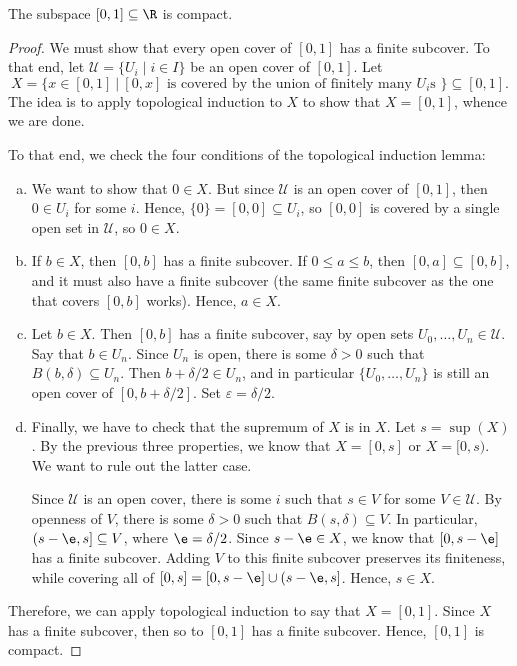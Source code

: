 \documentclass[noname]{notes}
\begin{document}
\begin{theorem}
	The subspace $[0,1] \subseteq \R$ is compact. 
\end{theorem}

\begin{proof}
	We must show that every open cover of $[0,1]$ has a finite subcover. To that end, let $\mathcal U = \{U_i \mid i \in I\}$ be an open cover of $[0,1]$. 
	Let 
	\[
		X = \Big\{ x\in [0,1] \ \Big\vert\ [0,x] \text{ is covered by the union of finitely many $U_i$s } \Big\} \subseteq [0,1].
	\]
	The idea is to apply topological induction to $X$ to show that $X = [0,1]$, whence we are done. 
	
	To that end, we check the four conditions of the topological induction lemma: 
	\begin{enumerate}[(a)]
		\item We want to show that $0 \in X$. But since $\mathcal U$ is an open cover of $[0,1]$, then $0 \in U_i$ for some $i$. Hence, $\{0\} = [0,0] \subseteq U_i$, so $[0,0]$ is covered by a single open set in $\mathcal U$, so $0 \in X$. 
		\item If $b \in X$, then $[0,b]$ has a finite subcover. If $0 \leq a \leq b$, then $[0,a] \subseteq [0,b]$, and it must also have a finite subcover (the same finite subcover as the one that covers $[0,b]$ works). Hence, $a \in X$. 
		\item Let $b \in X$. Then $[0,b]$ has a finite subcover, say by open sets $U_0, \ldots, U_n \in \mathcal U$. Say that $b \in U_n$. Since $U_n$ is open, there is some $\delta > 0$ such that $B(b,\delta)\subseteq U_n$. Then $b + \delta/2 \in U_n$, and in particular $\{U_0, \ldots, U_n\}$ is still an open cover of $[0,b+\delta/2]$. Set $\varepsilon = \delta/2$. 
		\item Finally, we have to check that the supremum of $X$ is in $X$. Let $s = \sup(X)$. By the previous three properties, we know that $X = [0,s]$ or $X = [0,s)$. We want to rule out the latter case. 
		
		Since $\mathcal U$ is an open cover, there is some $i$ such that $s \in V$ for some $V \in \mathcal U$. By openness of $V$, there is some $\delta > 0$ such that $B(s,\delta) \subseteq V$. In particular, $(s - \e, s] \subseteq V$, where $\e = \delta/2$. Since $s - \e \in X$, we know that $[0,s-\e]$ has a finite subcover. Adding $V$ to this finite subcover preserves its finiteness, while covering all of $[0,s] = [0,s-\e] \cup (s-\e,s]$. Hence, $s \in X$. 
	\end{enumerate}
	Therefore, we can apply topological induction to say that $X = [0,1]$. Since $X$ has a finite subcover, then so to $[0,1]$ has a finite subcover. Hence, $[0,1]$ is compact. 
\end{proof}
\end{document}
